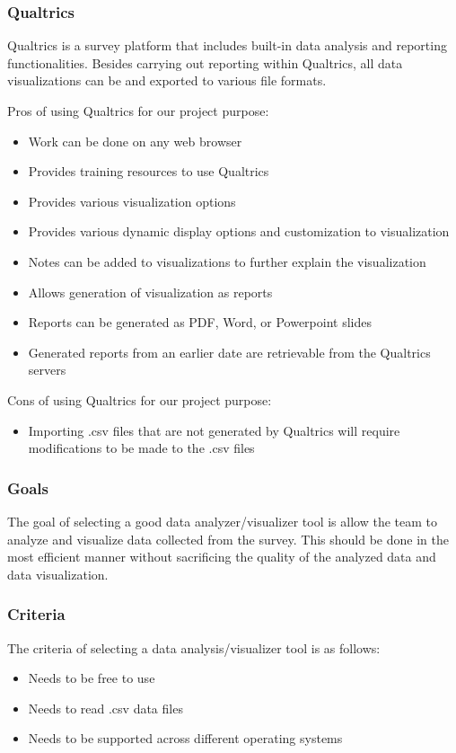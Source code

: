\documentclass[10pt,journal,compsoc,draftclsnofoot]{IEEEtran}
\begin{document}
\subsubsection{Qualtrics}
Qualtrics is a survey platform that includes built-in data analysis and reporting functionalities.
Besides carrying out reporting within Qualtrics, all data visualizations can be and exported to various file formats.

Pros of using Qualtrics for our project purpose:
\begin{itemize}
\item Work can be done on any web browser
\item Provides training resources to use Qualtrics
\item Provides various visualization options
\item Provides various dynamic display options and customization to visualization
\item Notes can be added to visualizations to further explain the visualization
\item Allows generation of visualization as reports
\item Reports can be generated as PDF, Word, or Powerpoint slides
\item Generated reports from an earlier date are retrievable from the Qualtrics servers 
\end{itemize}

Cons of using Qualtrics for our project purpose:
\begin{itemize}
\item Importing .csv files that are not generated by Qualtrics will require modifications to be made to the .csv files
\end{itemize}

\subsubsection{Goals}
The goal of selecting a good data analyzer/visualizer tool is allow the team to analyze and visualize data collected from the survey.
This should be done in the most efficient manner without sacrificing the quality of the analyzed data and data visualization.

\subsubsection{Criteria}
The criteria of selecting a data analysis/visualizer tool is as follows:
\begin{itemize}
\item Needs to be free to use
\item Needs to read .csv data files
\item Needs to be supported across different operating systems
\end{itemize}
\end{document}

